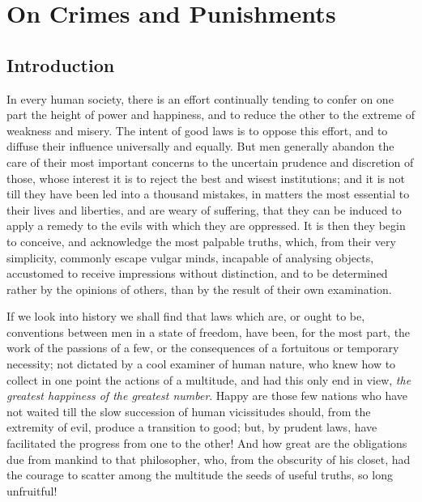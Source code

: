 
\author{Cesare Beccaria}
\chapter[On Crimes and Punishments, excerpt]{On Crimes and Punishments}

\section*{Introduction}

In every human society, there is an effort continually tending to
confer on one part the height of power and happiness, and to reduce
the other to the extreme of weakness and misery. The intent of good
laws is to oppose this effort, and to diffuse their influence
universally and equally. But men generally abandon the care of their
most important concerns to the uncertain prudence and discretion of
those, whose interest it is to reject the best and wisest
institutions; and it is not till they have been led into a thousand
mistakes, in matters the most essential to their lives and liberties,
and are weary of suffering, that they can be induced to apply a remedy
to the evils with which  they are oppressed. It is then they
begin to conceive, and acknowledge the most palpable truths, which,
from their very simplicity, commonly escape vulgar minds, incapable of
analysing objects, accustomed to receive impressions without
distinction, and to be determined rather by the opinions of others,
than by the result of their own examination.

If we look into history we shall find that laws which are, or ought to
be, conventions between men in a state of freedom, have been, for the
most part, the work of the passions of a few, or the consequences of a
fortuitous or temporary necessity; not dictated by a cool examiner of
human nature, who knew how to collect in one point the actions of a
multitude, and had this only end in view, \textit{the greatest
happiness of the greatest number}. Happy are those few nations who
have not waited till the slow succession of human vicissitudes should,
from the extremity of evil, produce a transition to good; but, by
prudent laws, have facilitated the progress from one to the other! And
how great are the obligations due from mankind to that philosopher,
who, from the obscurity of his closet, had the courage to scatter
among the multitude the seeds of useful truths, so long unfruitful!

